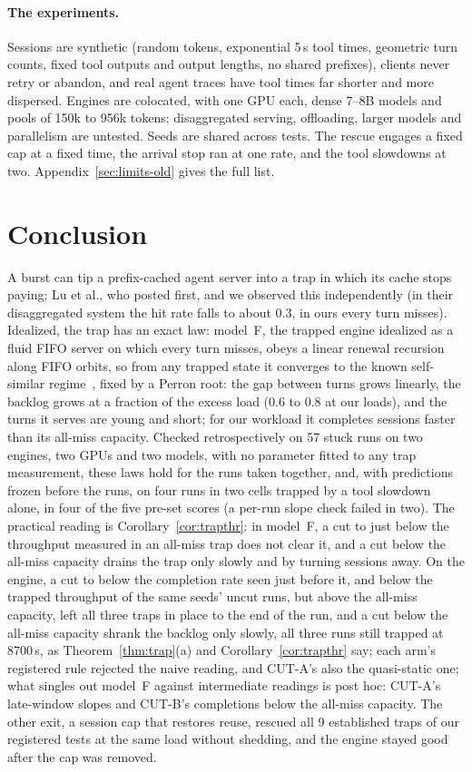 \paragraph{The experiments.} Sessions are synthetic (random tokens, exponential 5\,s tool times, geometric turn counts, fixed tool
outputs and output lengths, no shared prefixes), clients never retry or abandon, and real agent traces have tool times far shorter
and more dispersed. Engines are colocated, with one GPU each, dense 7--8B models and pools of 150k to 956k tokens; disaggregated
serving, offloading, larger models and parallelism are untested. Seeds are shared across tests. The rescue engages a fixed cap at
a fixed time, the arrival stop ran at one rate, and the tool slowdowns at two. Appendix~\ref{sec:limits-old} gives the full list.

\section{Conclusion}\label{sec:conclusion}

A burst can tip a prefix-cached agent server into a trap in which its cache stops paying; Lu et al., who posted first, and we
observed this independently (in their disaggregated system the hit rate falls to about 0.3, in ours every turn misses). Idealized, the
trap has an exact law: model~F, the trapped engine idealized as a fluid FIFO server on which every turn misses, obeys a linear
renewal recursion along
FIFO orbits, so from any trapped state it converges to the known self-similar regime~\citep{khanin2001steady}, fixed by a Perron
root: the gap
between turns grows linearly, the backlog grows at a fraction of the excess load (0.6 to 0.8 at our loads), and the turns it serves
are young and short; for our workload it completes sessions faster than its all-miss capacity. Checked retrospectively on 57 stuck
runs on two engines, two GPUs and two models, with no parameter fitted to any trap measurement, these laws hold for the runs taken
together, and, with predictions frozen before the runs, on four runs in two cells trapped by a tool slowdown alone, in four of the five pre-set scores (a per-run slope check failed in
two). The practical reading is Corollary~\ref{cor:trapthr}: in model~F, a cut to just below the throughput measured in an all-miss
trap does not clear it, and a cut below the all-miss capacity drains the trap only slowly and by turning sessions away.
On the engine, a cut to below the completion rate seen just before it, and below the trapped throughput of the same seeds' uncut
runs, but above the all-miss capacity, left all three traps in place to the end of the run, and a cut below the all-miss capacity
shrank the backlog only slowly, all three runs still trapped at 8700\,s, as Theorem~\ref{thm:trap}(a) and Corollary~\ref{cor:trapthr} say; each arm's registered rule rejected the naive reading, and CUT-A's also the quasi-static one; what singles out model~F
against intermediate readings is post hoc: CUT-A's late-window slopes and CUT-B's completions below the all-miss capacity.
The other exit, a session cap that restores reuse, rescued all 9 established traps of our registered tests at the same load without
shedding, and the engine stayed good after the cap was removed.

